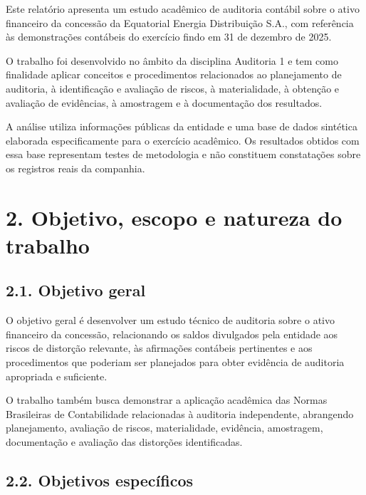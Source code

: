 \documentclass[
]{article}
\begin{document}
Este relatório apresenta um estudo acadêmico de auditoria contábil sobre
o ativo financeiro da concessão da Equatorial Energia Distribuição S.A.,
com referência às demonstrações contábeis do exercício findo em 31 de
dezembro de 2025.

O trabalho foi desenvolvido no âmbito da disciplina Auditoria 1 e tem
como finalidade aplicar conceitos e procedimentos relacionados ao
planejamento de auditoria, à identificação e avaliação de riscos, à
materialidade, à obtenção e avaliação de evidências, à amostragem e à
documentação dos resultados.

A análise utiliza informações públicas da entidade e uma base de dados
sintética elaborada especificamente para o exercício acadêmico. Os
resultados obtidos com essa base representam testes de metodologia e não
constituem constatações sobre os registros reais da companhia.

\section{2. Objetivo, escopo e natureza do
trabalho}\label{objetivo-escopo-e-natureza-do-trabalho}

\subsection{2.1. Objetivo geral}\label{objetivo-geral}

O objetivo geral é desenvolver um estudo técnico de auditoria sobre o
ativo financeiro da concessão, relacionando os saldos divulgados pela
entidade aos riscos de distorção relevante, às afirmações contábeis
pertinentes e aos procedimentos que poderiam ser planejados para obter
evidência de auditoria apropriada e suficiente.

O trabalho também busca demonstrar a aplicação acadêmica das Normas
Brasileiras de Contabilidade relacionadas à auditoria independente,
abrangendo planejamento, avaliação de riscos, materialidade, evidência,
amostragem, documentação e avaliação das distorções identificadas.

\subsection{2.2. Objetivos específicos}\label{objetivos-especuxedficos}
\end{document}
